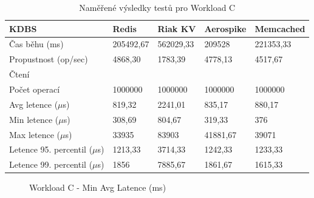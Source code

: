 \documentclass[czech,master,dept460,male,csharp,cpdeclaration]{diploma}
\begin{document}
	\begin{table}
		\centering
		\begin{tabular}{ l | l l l l }
			\toprule
			KDBS & Redis & Riak KV & Aerospike & Memcached \\
			\midrule
			Čas běhu (ms) & 205492,67 & 562029,33 & 209528 & 221353,33 \\
			Propustnost (op/sec) & 4868,30 & 1783,39 & 4778,13 & 4517,67 \\
			\midrule
			\multicolumn{5}{l}{Čtení} \\
			Počet operací & 1000000 & 1000000 & 1000000 & 1000000 \\
			Avg letence ($\mu$s) & 819,32 & 2241,01 & 835,17 & 880,17 \\
			Min letence ($\mu$s) & 308,69 & 804,67 & 319,33 & 376 \\
			Max letence ($\mu$s) & 33935 & 83903 & 41881,67 & 39071 \\
			Letence 95. percentil ($\mu$s) & 1213,33 & 3714,33 & 1242,33 & 1233,33 \\
			Letence 99. percentil ($\mu$s) & 1856 & 7885,67 & 1861,67 & 1615,33 \\
			\bottomrule
		\end{tabular}
		\caption{Naměřené výsledky testů pro Workload C\label{tab_workload_c}}
	\end{table}
	
	\begin{figure}
		\centering
		\caption{Workload C - Min Avg Latence (ms)}
		\label{graph_Workload C - Min Avg Latency (ms)}
	\end{figure}
	
\end{document}
